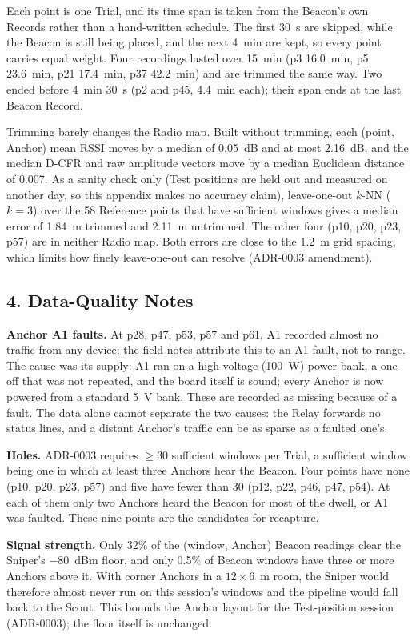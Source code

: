 Each point is one Trial, and its time span is taken from the Beacon's own Records rather than a hand-written schedule. The first 30~s are skipped, while the Beacon is still being placed, and the next 4~min are kept, so every point carries equal weight. Four recordings lasted over 15~min (p3 16.0~min, p5 23.6~min, p21 17.4~min, p37 42.2~min) and are trimmed the same way. Two ended before 4~min 30~s (p2 and p45, 4.4~min each); their span ends at the last Beacon Record.

Trimming barely changes the Radio map. Built without trimming, each (point, Anchor) mean RSSI moves by a median of 0.05~dB and at most 2.16~dB, and the median D-CFR and raw amplitude vectors move by a median Euclidean distance of 0.007. As a sanity check only (Test positions are held out and measured on another day, so this appendix makes no accuracy claim), leave-one-out $k$-NN ($k = 3$) over the 58 Reference points that have sufficient windows gives a median error of 1.84~m trimmed and 2.11~m untrimmed. The other four (p10, p20, p23, p57) are in neither Radio map. Both errors are close to the 1.2~m grid spacing, which limits how finely leave-one-out can resolve (ADR-0003 amendment).

\subsection*{4. Data-Quality Notes}
\textbf{Anchor A1 faults.} At p28, p47, p53, p57 and p61, A1 recorded almost no traffic from any device; the field notes attribute this to an A1 fault, not to range. The cause was its supply: A1 ran on a high-voltage (100~W) power bank, a one-off that was not repeated, and the board itself is sound; every Anchor is now powered from a standard 5~V bank. These are recorded as missing because of a fault. The data alone cannot separate the two causes: the Relay forwards no status lines, and a distant Anchor's traffic can be as sparse as a faulted one's.

\textbf{Holes.} ADR-0003 requires $\geq 30$ sufficient windows per Trial, a sufficient window being one in which at least three Anchors hear the Beacon. Four points have none (p10, p20, p23, p57) and five have fewer than 30 (p12, p22, p46, p47, p54). At each of them only two Anchors heard the Beacon for most of the dwell, or A1 was faulted. These nine points are the candidates for recapture.

\textbf{Signal strength.} Only 32\% of the (window, Anchor) Beacon readings clear the Sniper's $-80$~dBm floor, and only 0.5\% of Beacon windows have three or more Anchors above it. With corner Anchors in a $12 \times 6$~m room, the Sniper would therefore almost never run on this session's windows and the pipeline would fall back to the Scout. This bounds the Anchor layout for the Test-position session (ADR-0003); the floor itself is unchanged.

